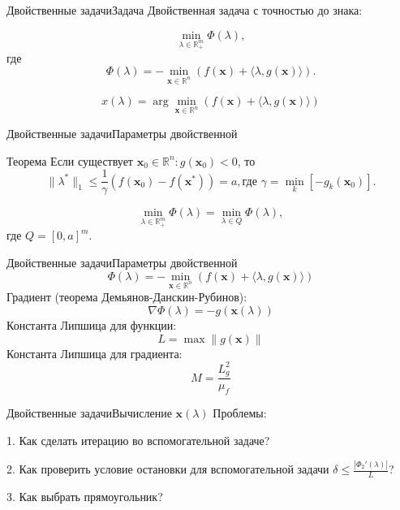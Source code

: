 \documentclass{beamer}
\begin{document}
\begin{frame}{Двойственные задачи}{Задача}
Двойственная задача с точностью до знака:

$$\min_{\lambda \in \mathbb{R}^m_+} \Phi(\lambda),$$
где $$\Phi(\lambda) = -\min\limits_{\textbf{x}\in \mathbb{R}^n}\left(f(\textbf{x}) + \langle\lambda, g(\textbf{x})\rangle\right).$$

$$x(\lambda) = \arg\min\limits_{\textbf{x}\in \mathbb{R}^n}\left(f(\textbf{x}) + \langle\lambda, g(\textbf{x})\rangle\right)$$
\end{frame}

\begin{frame}{Двойственные задачи}{Параметры двойственной}
\begin{block}{Теорема}
Если существует $\textbf{x}_0\in\mathbb{R}^n : g(\textbf{x}_0)<0$, то
$$\|\lambda^*\|_1 \leq \frac{1}{\gamma}\left(f(\textbf{x}_0)-f(\textbf{x}^*)\right)=a, \text{где } \gamma = \min_k \left[-g_k(\textbf{x}_0)\right].$$
\end{block}
\pause
$$\min_{\lambda\in\mathbb{R}^m_+}\Phi(\lambda) = \min_{\lambda\in Q}\Phi(\lambda),$$
где $Q = [0,a]^m$.
\end{frame}

\begin{frame}{Двойственные задачи}{Параметры двойственной}
$$\Phi(\lambda) = -\min\limits_{\textbf{x}\in \mathbb{R}^n}\left(f(\textbf{x}) + \langle\lambda, g(\textbf{x})\rangle\right)$$
Градиент (теорема Демьянов-Данскин-Рубинов):
$$\nabla \Phi(\lambda) = -g(\textbf{x}(\lambda))$$
Константа Липшица для функции:
$$L = \max\|g(\textbf{x})\|$$
Константа Липшица для градиента:
$$M = \frac{L_g^2}{\mu_f}$$
\end{frame}

\begin{frame}{Двойственные задачи}{Вычисление $\textbf{x}(\lambda)$}
Проблемы:

1. Как сделать итерацию во вспомогательной задаче?

2. Как проверить условие остановки для вспомогательной задачи $\delta \leq \frac{|\Phi_2'(\lambda)|}{L}$?

3. Как выбрать прямоугольник?
\end{frame}
\end{document}
